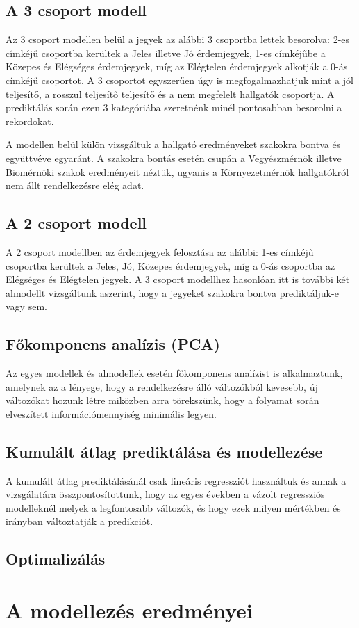 \documentclass[12pt]{article}
\begin{document}
\subsection{A 3 csoport modell}

Az 3 csoport modellen belül a jegyek az alábbi 3 csoportba lettek besorolva: 2-es címkéjű csoportba kerültek a Jeles illetve Jó érdemjegyek, 1-es címkéjűbe a Közepes és Elégséges érdemjegyek, míg az Elégtelen érdemjegyek alkotják a 0-ás címkéjű csoportot. A 3 csoportot egyszerűen úgy is megfogalmazhatjuk mint a jól teljesítő, a rosszul teljesítő teljesítő és a nem megfelelt hallgatók csoportja. A prediktálás során ezen 3 kategóriába szeretnénk minél pontosabban besorolni a rekordokat.

A modellen belül külön vizsgáltuk a hallgató eredményeket szakokra bontva és együttvéve egyaránt. A szakokra bontás esetén csupán a Vegyészmérnök illetve Biomérnöki szakok eredményeit néztük, ugyanis a Környezetmérnök hallgatókról nem állt rendelkezésre elég adat. 

\subsection{A 2 csoport modell}

A 2 csoport modellben az érdemjegyek felosztása az alábbi: 1-es címkéjű csoportba kerültek a Jeles, Jó, Közepes érdemjegyek, míg a 0-ás csoportba az Elégséges és Elégtelen jegyek. A 3 csoport modellhez hasonlóan itt is további két almodellt vizsgáltunk aszerint, hogy a jegyeket szakokra bontva prediktáljuk-e vagy sem. 

\subsection{Főkomponens analízis (PCA)}

Az egyes modellek és almodellek esetén főkomponens analízist is alkalmaztunk, amelynek az a lényege, hogy a rendelkezésre álló változókból kevesebb, új változókat hozunk létre miközben arra törekszünk, hogy a folyamat során elveszített információmennyiség minimális legyen.

\subsection{Kumulált átlag prediktálása és modellezése}

A kumulált átlag prediktálásánál csak lineáris regressziót használtuk és annak a vizsgálatára összpontosítottunk, hogy az egyes években a vázolt regressziós modelleknél melyek a legfontosabb változók, és hogy ezek milyen mértékben és irányban változtatják a predikciót.

\subsection{Optimalizálás}

\section{A modellezés eredményei}




\begin{thebibliography}{9}
\end{thebibliography}
\end{document}
